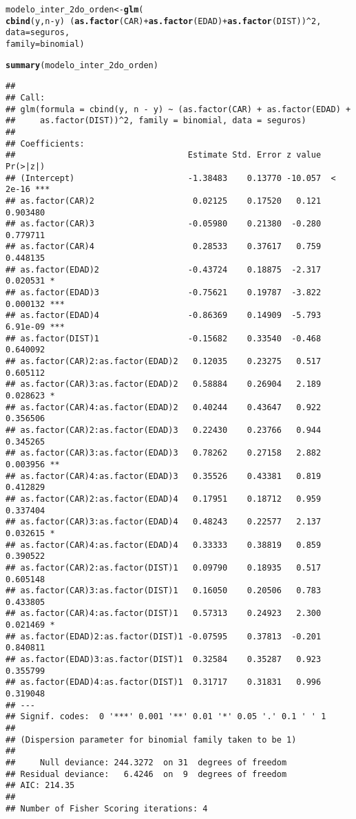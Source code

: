\documentclass[paper=letter, fontsize=11pt, draft=false]{scrartcl}\usepackage[]{graphicx}\usepackage[]{xcolor}
\makeatletter
\newcommand{\hlnum}[1]{\textcolor[rgb]{0.686,0.059,0.569}{#1}}%
\newcommand{\hlopt}[1]{\textcolor[rgb]{0,0,0}{#1}}%
\newcommand{\hldef}[1]{\textcolor[rgb]{0.345,0.345,0.345}{#1}}%
\newcommand{\hlkwb}[1]{\textcolor[rgb]{0.69,0.353,0.396}{#1}}%
\newcommand{\hlkwc}[1]{\textcolor[rgb]{0.333,0.667,0.333}{#1}}%
\newcommand{\hlkwd}[1]{\textcolor[rgb]{0.737,0.353,0.396}{\textbf{#1}}}%
\newenvironment{kframe}{%
 \def\at@end@of@kframe{}%
 \ifinner\ifhmode%
  \def\at@end@of@kframe{\end{minipage}}%
  \begin{minipage}{\columnwidth}%
 \fi\fi%
 \def\FrameCommand##1{\hskip\@totalleftmargin \hskip-\fboxsep
 \colorbox{shadecolor}{##1}\hskip-\fboxsep
     \hskip-\linewidth \hskip-\@totalleftmargin \hskip\columnwidth}%
 \MakeFramed {\advance\hsize-\width
   \@totalleftmargin\z@ \linewidth\hsize
   \@setminipage}}%
 {\par\unskip\endMakeFramed%
 \at@end@of@kframe}
\newenvironment{knitrout}{}{} %
\numberwithin{equation}{problemcounter} %
\numberwithin{figure}{problemcounter} %
\numberwithin{table}{problemcounter} %
\numberwithin{subsection}{problemcounter}
\makeatother
\begin{document}
\begin{knitrout}
\color{fgcolor}\begin{kframe}
\begin{alltt}
\hldef{modelo_inter_2do_orden} \hlkwb{<-} \hlkwd{glm}\hldef{(}
    \hlkwd{cbind}\hldef{(y, n} \hlopt{-} \hldef{y)} \hlopt{~} \hldef{(}\hlkwd{as.factor}\hldef{(CAR)} \hlopt{+} \hlkwd{as.factor}\hldef{(EDAD)} \hlopt{+} \hlkwd{as.factor}\hldef{(DIST))}\hlopt{^}\hlnum{2}\hldef{,}
    \hlkwc{data} \hldef{= seguros,}
    \hlkwc{family} \hldef{= binomial)}

\hlkwd{summary}\hldef{(modelo_inter_2do_orden)}
\end{alltt}
\begin{verbatim}
## 
## Call:
## glm(formula = cbind(y, n - y) ~ (as.factor(CAR) + as.factor(EDAD) + 
##     as.factor(DIST))^2, family = binomial, data = seguros)
## 
## Coefficients:
##                                   Estimate Std. Error z value Pr(>|z|)    
## (Intercept)                       -1.38483    0.13770 -10.057  < 2e-16 ***
## as.factor(CAR)2                    0.02125    0.17520   0.121 0.903480    
## as.factor(CAR)3                   -0.05980    0.21380  -0.280 0.779711    
## as.factor(CAR)4                    0.28533    0.37617   0.759 0.448135    
## as.factor(EDAD)2                  -0.43724    0.18875  -2.317 0.020531 *  
## as.factor(EDAD)3                  -0.75621    0.19787  -3.822 0.000132 ***
## as.factor(EDAD)4                  -0.86369    0.14909  -5.793 6.91e-09 ***
## as.factor(DIST)1                  -0.15682    0.33540  -0.468 0.640092    
## as.factor(CAR)2:as.factor(EDAD)2   0.12035    0.23275   0.517 0.605112    
## as.factor(CAR)3:as.factor(EDAD)2   0.58884    0.26904   2.189 0.028623 *  
## as.factor(CAR)4:as.factor(EDAD)2   0.40244    0.43647   0.922 0.356506    
## as.factor(CAR)2:as.factor(EDAD)3   0.22430    0.23766   0.944 0.345265    
## as.factor(CAR)3:as.factor(EDAD)3   0.78262    0.27158   2.882 0.003956 ** 
## as.factor(CAR)4:as.factor(EDAD)3   0.35526    0.43381   0.819 0.412829    
## as.factor(CAR)2:as.factor(EDAD)4   0.17951    0.18712   0.959 0.337404    
## as.factor(CAR)3:as.factor(EDAD)4   0.48243    0.22577   2.137 0.032615 *  
## as.factor(CAR)4:as.factor(EDAD)4   0.33333    0.38819   0.859 0.390522    
## as.factor(CAR)2:as.factor(DIST)1   0.09790    0.18935   0.517 0.605148    
## as.factor(CAR)3:as.factor(DIST)1   0.16050    0.20506   0.783 0.433805    
## as.factor(CAR)4:as.factor(DIST)1   0.57313    0.24923   2.300 0.021469 *  
## as.factor(EDAD)2:as.factor(DIST)1 -0.07595    0.37813  -0.201 0.840811    
## as.factor(EDAD)3:as.factor(DIST)1  0.32584    0.35287   0.923 0.355799    
## as.factor(EDAD)4:as.factor(DIST)1  0.31717    0.31831   0.996 0.319048    
## ---
## Signif. codes:  0 '***' 0.001 '**' 0.01 '*' 0.05 '.' 0.1 ' ' 1
## 
## (Dispersion parameter for binomial family taken to be 1)
## 
##     Null deviance: 244.3272  on 31  degrees of freedom
## Residual deviance:   6.4246  on  9  degrees of freedom
## AIC: 214.35
## 
## Number of Fisher Scoring iterations: 4
\end{verbatim}
\end{kframe}
\end{knitrout}
\end{document}
